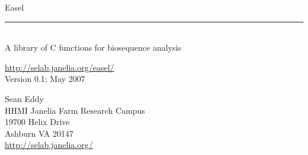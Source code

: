 \begin{titlepage}
{\Large

\vspace*{\fill}

\noindent
{\Huge{Easel}} \\ 
\rule[2pt]{\textwidth}{1pt} \\
\hspace*{\fill} {\large {A library of C functions for
    biosequence analysis} \\ }

\vspace*{\fill}

\begin{center}
\url{http://selab.janelia.org/easel/}\\
Version 0.1; May 2007 \\ 

\vspace*{\fill}

Sean Eddy\\
HHMI Janelia Farm Research Campus\\
19700 Helix Drive\\
Ashburn VA 20147\\
\url{http://selab.janelia.org/}\\
\end{center}

\vspace*{\fill}
}
\end{titlepage}
